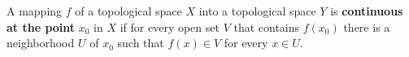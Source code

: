 A mapping $f$ of a topological space $X$ into a topological space $Y$ is \textbf{continuous at the point} $x_0$ in $X$ if for every open set $V$ that contains $f(x_0)$ there is a neighborhood $U$ of $x_0$ such that $f(x) \in V$ for every $x \in U$.
